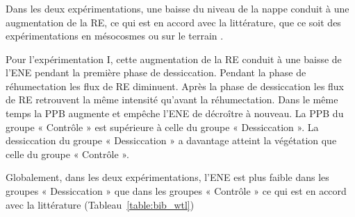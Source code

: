 \subsubsection{\coo}

Dans les deux expérimentations, une baisse du niveau de la nappe conduit à une augmentation de la RE, ce qui est en accord avec la littérature, que ce soit des expérimentations en mésocosmes \citet{blodau2004,dinsmore2009} ou sur le terrain \citet{ballantyne2014}. 

Pour l'expérimentation I, cette augmentation de la RE conduit à une baisse de l'ENE pendant la première phase de dessiccation.
Pendant la phase de réhumectation les flux de RE diminuent.
Après la phase de dessiccation les flux de RE retrouvent la même intensité qu'avant la réhumectation.
Dans le même temps la PPB augmente et empêche l'ENE de décroître à nouveau.
La PPB du groupe « Contrôle » est supérieure à celle du groupe « Dessiccation ».
La dessiccation du groupe « Dessiccation » a davantage atteint la végétation que celle du groupe « Contrôle ».


Globalement, dans les deux expérimentations, l'ENE est plus faible dans les groupes « Dessiccation » que dans les groupes « Contrôle » ce qui est en accord avec la littérature (Tableau~\ref{table:bib_wtl})

